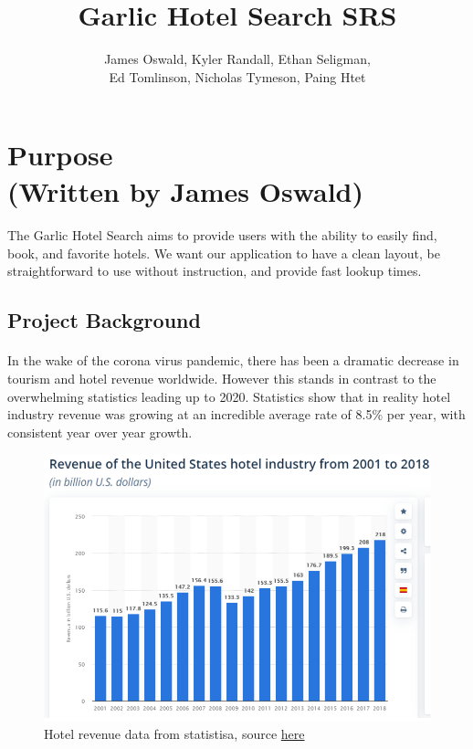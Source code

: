 \documentclass[]{article}
\title{Garlic Hotel Search SRS}
\author{James Oswald, Kyler Randall, Ethan Seligman,\\ Ed Tomlinson, Nicholas Tymeson, Paing Htet}
\date{}
\begin{document}
\maketitle
\thispagestyle{fancy}

\tableofcontents

\section{Purpose \\(Written by James Oswald)}
\paragraph{}
The Garlic Hotel Search aims to provide users with the ability to easily find, book, and favorite hotels. We want our application to have a clean layout, be straightforward to use without instruction, and provide fast lookup times.
\subsection{Project Background}
\paragraph{}
In the wake of the corona virus pandemic, there has been a dramatic decrease in tourism and hotel revenue worldwide. However this stands in contrast to the overwhelming statistics leading up to 2020. Statistics show that in reality hotel industry revenue was growing at an incredible average rate of 8.5\% per year, with consistent year over year growth.
\begin{figure}[H]
    \centering
    \includegraphics[scale=0.4]{hotelstats.png}
    \caption{Hotel revenue data from statistisa, source \href{https://www.statista.com/statistics/245841/total-revenue-of-the-us-hotel-industry/}{here}}
\end{figure}
\end{document}
